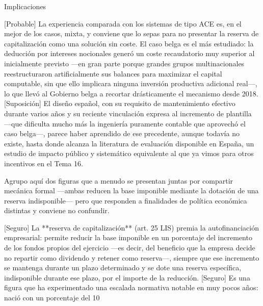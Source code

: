 \documentclass[10pt,a4paper]{article}
\begin{document}
Implicaciones

[Probable] La experiencia comparada con los sistemas de tipo ACE es, en el mejor de los casos, mixta, y conviene que lo sepas para no presentar la reserva de capitalización como una solución sin coste. El caso belga es el más estudiado: la deducción por intereses nocionales generó un coste recaudatorio muy superior al inicialmente previsto —en gran parte porque grandes grupos multinacionales reestructuraron artificialmente sus balances para maximizar el capital computable, sin que ello implicara ninguna inversión productiva adicional real—, lo que llevó al Gobierno belga a recortar drásticamente el mecanismo desde 2018. [Suposición] El diseño español, con su requisito de mantenimiento efectivo durante varios años y su reciente vinculación expresa al incremento de plantilla —que dificulta mucho más la ingeniería puramente contable que aprovechó el caso belga—, parece haber aprendido de ese precedente, aunque todavía no existe, hasta donde alcanza la literatura de evaluación disponible en España, un estudio de impacto público y sistemático equivalente al que ya vimos para otros incentivos en el Tema 16.

Agrupo aquí dos figuras que a menudo se presentan juntas por compartir mecánica formal —ambas reducen la base imponible mediante la dotación de una reserva indisponible— pero que responden a finalidades de política económica distintas y conviene no confundir.

[Seguro] La **reserva de capitalización** (art. 25 LIS) premia la autofinanciación empresarial: permite reducir la base imponible en un porcentaje del incremento de los fondos propios del ejercicio —es decir, del beneficio que la empresa decide no repartir como dividendo y retener como reserva—, siempre que ese incremento se mantenga durante un plazo determinado y se dote una reserva específica, indisponible durante ese plazo, por el importe de la reducción. [Seguro] Es una figura que ha experimentado una escalada normativa notable en muy pocos años: nació con un porcentaje del 10%
\end{document}
